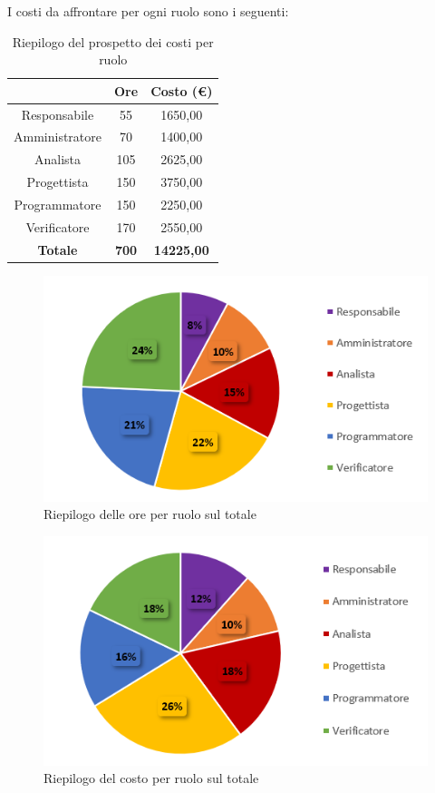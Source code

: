 \pagebreak
   I costi da affrontare per ogni ruolo sono i seguenti:
   
   \begin{table}[H]
       \centering
       \renewcommand{\arraystretch}{1.8}
       \begin{tabular}{c|c|c}
         \rowcolor[HTML]{125E28} 
         \multicolumn{1}{c}{\color[HTML]{FFFFFF}\textbf{Ruolo}}
         & \multicolumn{1}{c}{\color[HTML]{FFFFFF}\textbf{Ore}}
         & \multicolumn{1}{c}{\color[HTML]{FFFFFF}\textbf{Costo (€)}}\\
         \hline
         Responsabile   & 55 & 1650,00\\
         Amministratore & 70 & 1400,00\\
         Analista       & 105 & 2625,00\\
         Progettista    & 150 & 3750,00\\
         Programmatore  & 150 & 2250,00\\
         Verificatore   & 170 & 2550,00\\
         \textbf{Totale} & \textbf{700} & \textbf{14225,00}
       \end{tabular}
       \caption{Riepilogo del prospetto dei costi per ruolo}
     \end{table}
   
     \begin{figure}[H]
       \centering
        \includegraphics[scale=0.9]{immagini/ore_ruolo_riepilogo.png}
        \caption{Riepilogo delle ore per ruolo sul totale}
      \end{figure}
   
     \begin{figure}[H]
       \centering
        \includegraphics[scale=0.9]{immagini/costo_ruolo_riepilogo.png}
        \caption{Riepilogo del costo per ruolo sul totale}
      \end{figure}

